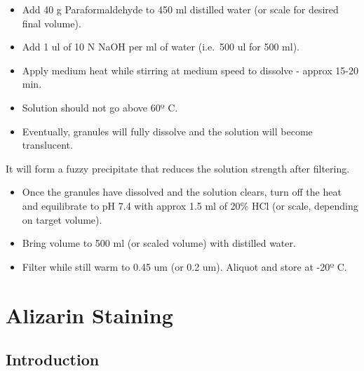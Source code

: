 \documentclass[
  letterpaper,
  DIV=11,
  numbers=noendperiod]{scrreprt}
\begin{document}
\begin{itemize}
\item
  Add 40 g Paraformaldehyde to 450 ml distilled water (or scale for
  desired final volume).
\item
  Add 1 ul of 10 N NaOH per ml of water (i.e.~500 ul for 500 ml).
\item
  Apply medium heat while stirring at medium speed to dissolve - approx
  15-20 min.
\item
  Solution should not go above 60º C.
\item
  Eventually, granules will fully dissolve and the solution will become
  translucent.
\end{itemize}

\begin{tcolorbox}[enhanced jigsaw, rightrule=.15mm, title=\textcolor{quarto-callout-note-color}{\faInfo}\hspace{0.5em}{DO NOT LET THE SOLUTION STIR BEYOND THIS POINT}, titlerule=0mm, opacitybacktitle=0.6, toprule=.15mm, bottomrule=.15mm, opacityback=0, left=2mm, colframe=quarto-callout-note-color-frame, breakable, coltitle=black, colback=white, colbacktitle=quarto-callout-note-color!10!white, bottomtitle=1mm, leftrule=.75mm, toptitle=1mm, arc=.35mm]

It will form a fuzzy precipitate that reduces the solution strength
after filtering.

\end{tcolorbox}

\begin{itemize}
\item
  Once the granules have dissolved and the solution clears, turn off the
  heat and equilibrate to pH 7.4 with approx 1.5 ml of 20\% HCl (or
  scale, depending on target volume).
\item
  Bring volume to 500 ml (or scaled volume) with distilled water.
\item
  Filter while still warm to 0.45 um (or 0.2 um). Aliquot and store at
  -20º C.
\end{itemize}

\hypertarget{sec-molecular_alizarin}{%
\chapter{Alizarin Staining}\label{sec-molecular_alizarin}}

\hypertarget{introduction-15}{%
\section{Introduction}\label{introduction-15}}
\end{document}
